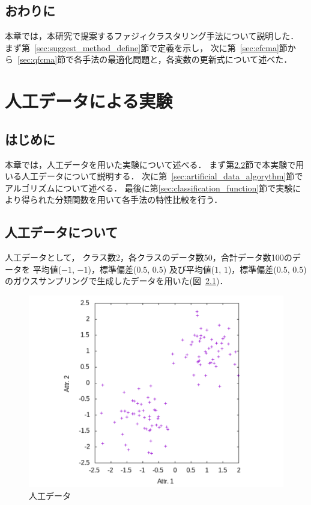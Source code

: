 \documentclass[a4j,12pt,dvipdfmx,oneside]{jsbook}
\theoremstyle{definition}
\begin{document}
 \section{おわりに}\label{sec:suggest_method_summary}
 本章では，本研究で提案するファジィクラスタリング手法について説明した．
 まず第~\ref{sec:suggest_method_define}節で定義を示し，
 次に第~\ref{sec:efcma}節から~\ref{sec:qfcma}節で各手法の最適化問題と，各変数の更新式について述べた．
 
 
 
\chapter{人工データによる実験}\label{chap:artificial_data}

 \section{はじめに}\label{sec:artificial_data_intro}
 本章では，人工データを用いた実験について述べる．
 まず第\ref{sec:about_artificial_data}節で本実験で用いる人工データについて説明する．
 次に第~\ref{sec:artificial_data_algorythm}節でアルゴリズムについて述べる．
 最後に第\ref{sec:classification_function}節で実験により得られた分類関数を用いて各手法の特性比較を行う．
 
 \section{人工データについて}\label{sec:about_artificial_data}
 人工データとして，
 クラス数2，各クラスのデータ数50，合計データ数100のデータを
 平均値($-1$, $-1$)，標準偏差($0.5$, $0.5$)
 及び平均値($1$, $1$)，標準偏差($0.5$, $0.5$)
 のガウスサンプリングで生成したデータを用いた(図~\ref{fig:artificial_data})．
 \begin{figure}[p]
  \centering
  \includegraphics[width=\linewidth]{2d-dat.pdf}
  \caption{人工データ}
  \label{fig:artificial_data}
 \end{figure}
\end{document}
